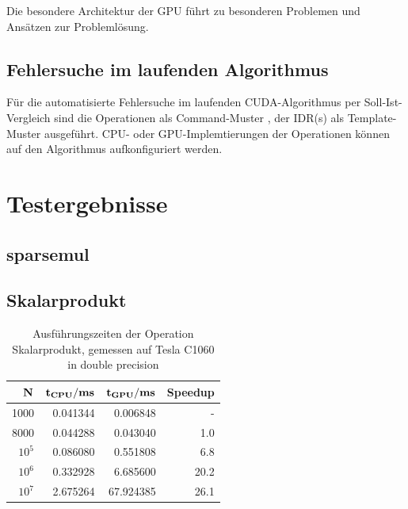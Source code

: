 \documentclass[journal]{IEEEtran}
\begin{document}
Die besondere Architektur der GPU führt zu besonderen Problemen
und Ansätzen zur Problemlösung.






%

\subsection{Fehlersuche im laufenden Algorithmus}


Für die automatisierte Fehlersuche im laufenden CUDA-Algorithmus per Soll-Ist-Vergleich
sind die Operationen als Command-Muster \cite{entwurfsmuster},
der IDR(s) als Template-Muster \cite{entwurfsmuster} ausgeführt. CPU- oder
GPU-Implemtierungen der Operationen können auf den Algorithmus aufkonfiguriert werden.




\section{Testergebnisse}

\subsection{sparsemul}



\subsection{Skalarprodukt}





\begin{table}[h]
\renewcommand{\arraystretch}{1.3}
\caption{Ausführungszeiten der Operation Skalarprodukt, gemessen auf Tesla C1060 in double precision}
\label{valuesdotmul}
\centering
\begin{tabular}{|r||r|r|r|}
\hline
\bfseries $ \bf N$ & \bfseries{ $ \bf t_{CPU} / ms $ } &  $ \bf t_{GPU} / ms$ & \bfseries{Speedup} \\
\hline\hline


1000   &  0.041344 & 0.006848 & - \\
8000  &  0.044288 & 0.043040     &    1.0 \\
$ 10^5 $ &  0.086080 & 0.551808    &   6.8 \\
$ 10^6 $ & 0.332928 & 6.685600    &   20.2 \\
$ 10^7 $ & 2.675264 & 67.924385  & 26.1 \\

\hline
\end{tabular}
\end{table}
\end{document}
